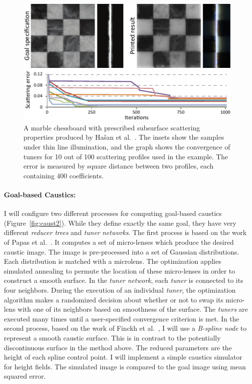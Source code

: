 \begin{figure}
\centering
\includegraphics[width=0.65\linewidth]{figure/fig_chess.pdf}
\caption{
	A marble chessboard with prescribed subsurface scattering properties produced by Ha\v{s}an et al.~.
	The insets show the samples under thin line illumination, and the graph shows the convergence of tuners for 10 out of 100 scattering profiles used in the example. The error is measured by square distance between two profiles, each containing 400 coefficients.}
\label{fig:sub}
\end{figure}

\paragraph{Goal-based Caustics:}
I will configure two different processes for computing goal-based caustics (Figure~\ref{fig:caust2}). While they define exactly the same goal, they have very different \emph{reducer trees} and \emph{tuner networks}.
The first process is based on the work of Papas et al.~.
It computes a set of micro-lenses which produce the desired caustic image. The image is pre-processed into a set of Gaussian distributions. Each distribution is matched with a microlens. The optimization applies simulated annealing to permute the location of these micro-lenses in order to construct a smooth surface. In the \emph{tuner network}, each \emph{tuner} is connected to its four neighbors. During the execution of an individual \emph{tuner}, the optimization algorithm makes a randomized decision about whether or not to swap its micro-lens with one of its neighbors based on smoothness of the surface. 
The \emph{tuners} are executed many times until a user-specified convergence criterion is met. 
In the second process, based on the work of Finckh et al.~, I will use a \emph{B-spline node} to represent a smooth caustic surface.
This is in contrast to the potentially discontinuous surface in the method above.
The reduced parameters are the height of each spline control point.
I will implement a simple caustics simulator for height fields.
The simulated image is compared to the goal image using mean squared error.

